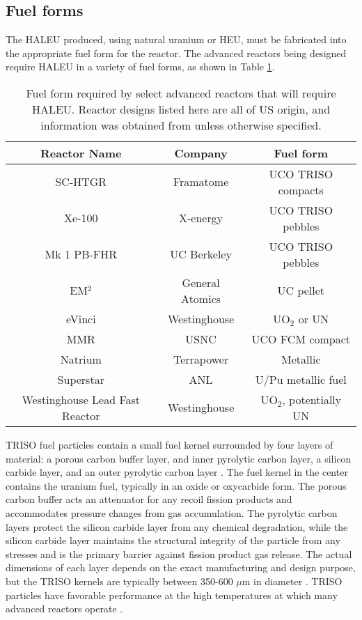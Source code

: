 \subsection{Fuel forms}
The \gls{HALEU} produced, using natural uranium or \gls{HEU}, must be 
fabricated into the appropriate fuel form for the reactor.
The advanced reactors being designed require \gls{HALEU} in a 
variety of fuel forms, as shown in Table \ref{tab:fuel_forms}.  

\begin{table}[ht]
    \centering
    \caption{Fuel form required by select advanced reactors that will 
    require \gls{HALEU}. Reactor designs listed here are all of US origin, 
    and information was obtained from \cite{hussain_advances_2018} unless 
    otherwise specified.}
    \label{tab:fuel_forms}
    \begin{tabular}{c c c}
        \hline
        Reactor Name & Company & Fuel form \\\hline 
        SC-HTGR & Framatome & UCO TRISO compacts \\
        Xe-100 \cite{harlan_x-energy_2018} & X-energy & UCO TRISO pebbles \\
        Mk 1 PB-FHR & UC Berkeley & UCO TRISO pebbles\\
        EM$^2$ & General Atomics & UC pellet \\
        eVinci & Westinghouse & UO$_2$ or UN \\
        \gls{MMR} \cite{mitchell_usnc_2020} & \gls{USNC} & UCO FCM compact\\
        Natrium & Terrapower & Metallic \\
        Superstar  & \gls{ANL} & U/Pu metallic fuel \\
        Westinghouse Lead Fast Reactor  & Westinghouse & UO$_2$, potentially UN \\
        \hline        
        
    \end{tabular}
\end{table}

\gls{TRISO} fuel particles contain 
a small fuel kernel surrounded by four layers of material: a porous carbon 
buffer layer, and inner pyrolytic carbon layer, a silicon carbide layer, 
and an outer pyrolytic carbon layer \cite{demkowicz_coated_2019}. The fuel 
kernel in the center contains the uranium fuel, typically in an oxide 
or oxycarbide form. The porous carbon buffer acts an attenuator for any 
recoil fission products and accommodates pressure changes from gas 
accumulation.
The pyrolytic carbon layers protect the silicon carbide layer from 
any chemical degradation, while the silicon carbide layer maintains the 
structural integrity of the particle from any stresses and is the primary 
barrier against fission product gas release. The actual dimensions 
of each layer depends on the exact manufacturing and design purpose, but 
the \gls{TRISO} kernels are typically between 350-600 $\mu$m in diameter 
\cite{demkowicz_coated_2019}. \gls{TRISO} particles have 
favorable performance at the high temperatures 
at which many advanced reactors operate \cite{demkowicz_coated_2019}. 

